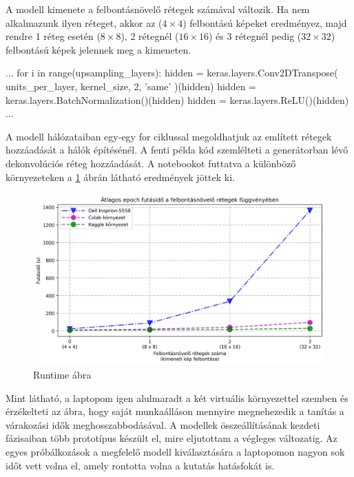 A modell kimenete a felbontásnövelő rétegek számával változik. Ha nem alkalmazunk ilyen réteget, akkor az ($4 \times 4$) felbontású képeket eredményez, majd rendre 1 réteg esetén ($8 \times 8$), 2 rétegnél ($16 \times 16$) és 3 rétegnél pedig ($32 \times 32$) felbontású képek jelennek meg a kimeneten.

\begin{python}
...
for i in range(upsampling_layers):
    hidden = keras.layers.Conv2DTranspose(
        units_per_layer, kernel_size, 2, 'same'
    )(hidden)
    hidden = keras.layers.BatchNormalization()(hidden)
    hidden = keras.layers.ReLU()(hidden)
...
\end{python}

A modell hálózataiban egy-egy for ciklussal megoldhatjuk az említett rétegek hozzáadását a hálók építésénél. A fenti példa kód szemlélteti a generátorban lévő dekonvolúciós réteg hozzáadását.
A notebookot futtatva a különböző környezeteken a \ref{fig:runtime} ábrán látható eredmények jöttek ki.

\begin{figure}[h]
\centering
\includegraphics[width=15cm]{images/runtime.png}
\caption{Runtime ábra}
\label{fig:runtime}
\end{figure}

Mint látható, a laptopom igen alulmaradt a két virtuális környezettel szemben és érzékelteti az ábra, hogy saját munkaálláson mennyire megnehezedik a tanítás a várakozási idők meghosszabbodásával. A modellek összeállításának kezdeti fázisaiban több prototípus készült el, mire eljutottam a végleges változatig. Az egyes próbálkozások a megfelelő modell kiválasztására a laptopomon nagyon sok időt vett volna el, amely rontotta volna a kutatás hatásfokát is.
